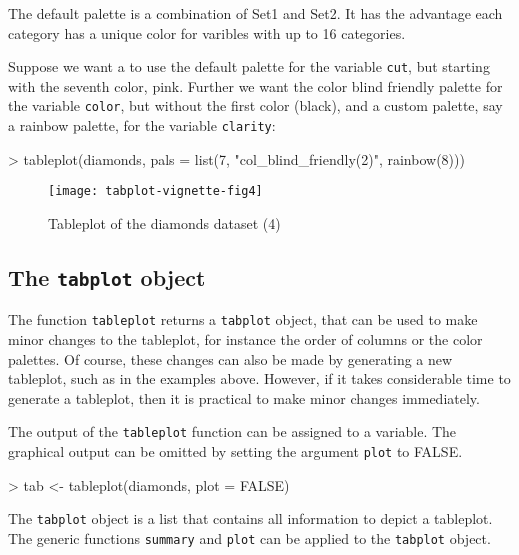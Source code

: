 \documentclass[11pt, fleqn, a4paper]{article}
\begin{document}
The default palette is a combination of Set1 and Set2. It has the advantage each category has a unique color for varibles with up to 16 categories.

Suppose we want a to use the default palette for the variable {\tt cut}, but starting with the seventh color, pink. Further we want the color blind friendly palette for the variable {\tt color}, but without the first color (black), and a custom palette, say a rainbow palette, for the variable {\tt clarity}:

\begin{Schunk}
\begin{Sinput}
> tableplot(diamonds, pals = list(7, "col_blind_friendly(2)", rainbow(8)))
\end{Sinput}
\end{Schunk}

\begin{figure}
\begin{center}
\texttt{[image: tabplot-vignette-fig4]}
\end{center}
\caption{Tableplot of the diamonds dataset (4)}
\label{fig:tp4}
\end{figure}

\subsection{The {\tt tabplot} object}

The function {\tt tableplot} returns a {\tt tabplot} object, that can be used to make minor changes to the tableplot, for instance the order of columns or the color palettes. Of course, these changes can also be made by generating a new tableplot, such as in the examples above. However, if it takes considerable time to generate a tableplot, then it is practical to make minor changes immediately.

The output of the {\tt tableplot} function can be assigned to a variable. The graphical output can be omitted by setting the argument {\tt plot} to FALSE.

\begin{Schunk}
\begin{Sinput}
> tab <- tableplot(diamonds, plot = FALSE)
\end{Sinput}
\end{Schunk}

The {\tt tabplot} object is a list that contains all information to depict a tableplot. The generic functions {\tt summary} and {\tt plot} can be applied to the {\tt tabplot} object.
\end{document}
